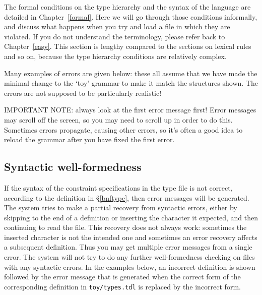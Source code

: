 \documentclass[12pt]{report}
\newcommand{\filename}[1]{{\tt #1}}
\begin{document}
The formal conditions on the type hierarchy and the syntax of the
language are
detailed in Chapter~\ref{formal}.
Here we
will go through those conditions informally, and discuss what
happens when you try and load a file in which they are violated.
If you do not understand the terminology, please refer back to
Chapter~\ref{easy}.
This section is lengthy compared to the sections
on lexical rules and so on, because the type hierarchy conditions
are relatively complex.

Many examples of errors 
are given below: these all assume that we have made the minimal
change to the `toy' grammar to make it match the structures shown.
The errors are not supposed to be particularly realistic!

IMPORTANT NOTE:  always look at the first error message first!
Error messages may scroll off the screen, so you may need to scroll up
in order to do this.  Sometimes errors propagate,
causing other errors, so it's often a good idea to reload the grammar
after you have fixed the first error.

\subsection{Syntactic well-formedness}
\label{synwf}
If the syntax of the constraint specifications in the type file is not 
correct, according to the definition in \S\ref{bnftype},
then error messages will be generated.  The system tries
to make a partial
recovery from syntactic errors, either by
skipping to the end of a definition or inserting the
character it expected,
and then continuing to read the file.
This recovery does not always work: sometimes the
inserted character is not the intended one and sometimes an
error recovery affects a subsequent definition.
Thus you may get multiple error messages from a single error.
The system will
not try to do any further well-formedness checking
on files with any syntactic errors.
In the examples below, an incorrect definition is shown
followed by the error message that is generated when the correct form of the
corresponding definition in \filename{toy/types.tdl} is replaced by 
the incorrect form.
\end{document}
